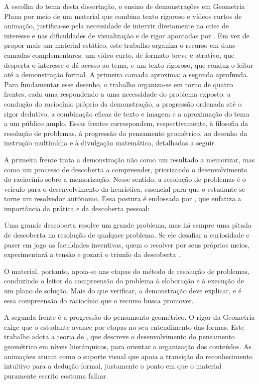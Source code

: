 A escolha do tema desta dissertação, o ensino de demonstrações em Geometria Plana por meio de um material que combina texto rigoroso e vídeos curtos de animação, justifica-se pela necessidade de intervir diretamente na crise de interesse e nas dificuldades de visualização e de rigor apontadas por . Em vez de propor mais um material estático, este trabalho organiza o recurso em duas camadas complementares: um vídeo curto, de formato breve e atrativo, que desperta o interesse e dá acesso ao tema, e um texto rigoroso, que conduz o leitor até a demonstração formal. A primeira camada aproxima; a segunda aprofunda. Para fundamentar esse desenho, o trabalho organiza-se em torno de quatro frentes, cada uma respondendo a uma necessidade do problema exposto: a condução do raciocínio próprio da demonstração, a progressão ordenada até o rigor dedutivo, a combinação eficaz de texto e imagem e a aproximação do tema a um público amplo. Essas frentes correspondem, respectivamente, à filosofia da resolução de problemas, à progressão do pensamento geométrico, ao desenho da instrução multimídia e à divulgação matemática, detalhadas a seguir. 

A primeira frente trata a demonstração não como um resultado a memorizar, mas como um processo de descoberta a compreender, priorizando o desenvolvimento do raciocínio sobre a memorização. Nesse sentido, a resolução de problemas é o veículo para o desenvolvimento da heurística, essencial para que o estudante se torne um resolvedor autônomo. Essa postura é endossada por , que enfatiza a importância da prática e da descoberta pessoal:

\begin{citacao}
Uma grande descoberta resolve um grande problema, mas há sempre uma pitada de descoberta na resolução de qualquer problema. Se ele desafiar a curiosidade e puser em jogo as faculdades inventivas, quem o resolver por seus próprios meios, experimentará a tensão e gozará o triunfo da descoberta \cite[p.~V]{polya2006arte}.
\end{citacao}

O material, portanto, apoia-se nas etapas do método de resolução de problemas, conduzindo o leitor da compreensão do problema à elaboração e à execução de um plano de solução. Mais do que verificar, a demonstração deve explicar, e é essa compreensão do raciocínio que o recurso busca promover.

A segunda frente é a progressão do pensamento geométrico. O rigor da Geometria exige que o estudante avance por etapas no seu entendimento das formas. Este trabalho adota a teoria de , que descreve o desenvolvimento do pensamento geométrico em níveis hierárquicos, para orientar a organização dos conteúdos. As animações atuam como o suporte visual que apoia a transição do reconhecimento intuitivo para a dedução formal, justamente o ponto em que o material puramente escrito costuma falhar.

